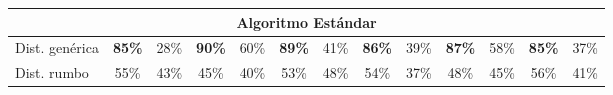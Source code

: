 \documentclass[12pt,a4paper]{article}
\begin{document}
\begin{table}[H]
{\begin{tabular}{l|cc|cc|cc|cc|cc|cc|}
\hline
\multicolumn{13}{c}{{\cellcolor[rgb]{0.796,0.808,0.984}}Algoritmo Estándar}                                                                                                                                                                                                                                                                                                                                                                                                                                                                                                                                                                                                                                                                                                                                                                                \\ 
\hline
\rowcolor[rgb]{0.925,0.957,1} Dist. genérica                                                                                                                                                  & \textbf{\textbf{\textcolor[rgb]{0,0.502,0}{85\%}}} & 28\%                                               & \textbf{\textbf{\textcolor[rgb]{0,0.502,0}{90\%}}} & 60\%                                               & \textbf{\textbf{\textcolor[rgb]{0,0.502,0}{89\%}}} & 41\%                                               & \textbf{\textbf{\textcolor[rgb]{0,0.502,0}{86\%}}} & 39\%                                               & \textbf{\textbf{\textcolor[rgb]{0,0.502,0}{87\%}}} & 58\%                                               & \textbf{\textbf{\textcolor[rgb]{0,0.502,0}{85\%}}} & 37\%                                                \\
\rowcolor[rgb]{0.855,0.91,0.988} Dist. rumbo                                                                                                                                                  & 55\%                                               & 43\%                                               & 45\%                                               & 40\%                                               & 53\%                                               & 48\%                                               & 54\%                                               & 37\%                                               & 48\%                                               & 45\%                                               & 56\%                                               & 41\%                                                \\

\end{tabular}}
\end{table}
\end{document}
